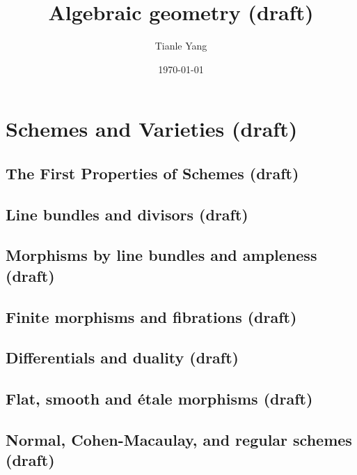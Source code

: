 \documentclass[sectionlevel=book]{noteformyself}
\title{Algebraic geometry (draft)}
\author{Tianle Yang}
\date{\today}
\begin{document}
    \maketitle

    \frontmatter

    \tableofcontents

    \mainmatter

    \chapter{Schemes and Varieties (draft)}
        \section{The First Properties of Schemes (draft)}
        
        \section{Line bundles and divisors (draft)}
        
        \section{Morphisms by line bundles and ampleness (draft)}
        
        \section{Finite morphisms and fibrations (draft)}
        
        \section{Differentials and duality (draft)}
        
        \section{Flat, smooth and étale morphisms (draft)}
        
        \section{Normal, Cohen-Macaulay, and regular schemes (draft)}
        
\end{document}
